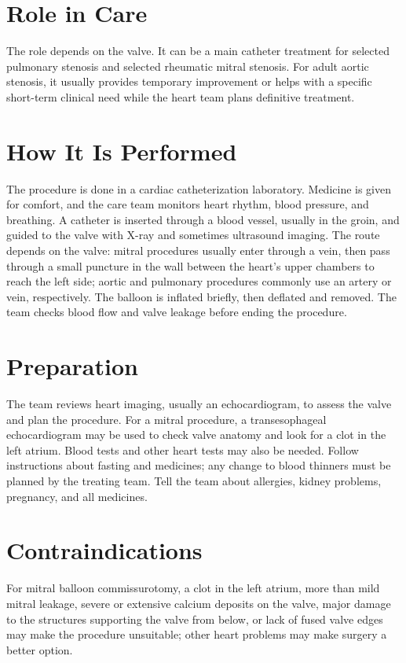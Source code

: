 \section*{Role in Care}
The role depends on the valve. It can be a main catheter treatment for selected pulmonary stenosis and selected rheumatic mitral stenosis. For adult aortic stenosis, it usually provides temporary improvement or helps with a specific short-term clinical need while the heart team plans definitive treatment.

\section*{How It Is Performed}
The procedure is done in a cardiac catheterization laboratory. Medicine is given for comfort, and the care team monitors heart rhythm, blood pressure, and breathing. A catheter is inserted through a blood vessel, usually in the groin, and guided to the valve with X-ray and sometimes ultrasound imaging. The route depends on the valve: mitral procedures usually enter through a vein, then pass through a small puncture in the wall between the heart's upper chambers to reach the left side; aortic and pulmonary procedures commonly use an artery or vein, respectively. The balloon is inflated briefly, then deflated and removed. The team checks blood flow and valve leakage before ending the procedure.

\section*{Preparation}
The team reviews heart imaging, usually an echocardiogram, to assess the valve and plan the procedure. For a mitral procedure, a transesophageal echocardiogram may be used to check valve anatomy and look for a clot in the left atrium. Blood tests and other heart tests may also be needed. Follow instructions about fasting and medicines; any change to blood thinners must be planned by the treating team. Tell the team about allergies, kidney problems, pregnancy, and all medicines.

\section*{Contraindications}
For mitral balloon commissurotomy, a clot in the left atrium, more than mild mitral leakage, severe or extensive calcium deposits on the valve, major damage to the structures supporting the valve from below, or lack of fused valve edges may make the procedure unsuitable; other heart problems may make surgery a better option.

